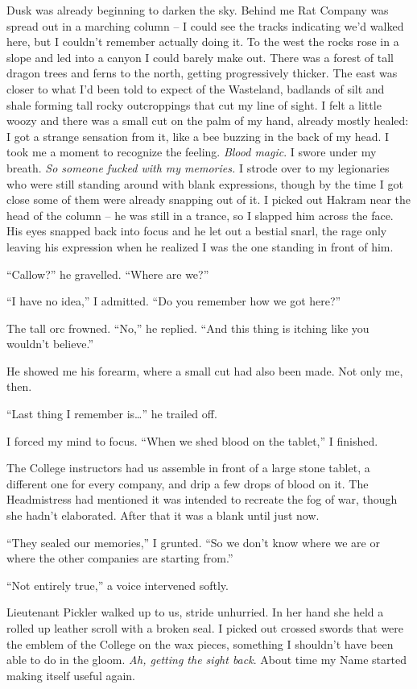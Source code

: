 \documentclass[12pt, openany]{book}
\begin{document}
Dusk was already beginning to darken the sky. Behind me Rat Company was spread out in a marching column – I could see the tracks indicating we’d walked here, but I couldn’t remember actually doing it. To the west the rocks rose in a slope and led into a canyon I could barely make out. There was a forest of tall dragon trees and ferns to the north, getting progressively thicker. The east was closer to what I’d been told to expect of the Wasteland, badlands of silt and shale forming tall rocky outcroppings that cut my line of sight. I felt a little woozy and there was a small cut on the palm of my hand, already mostly healed: I got a strange sensation from it, like a bee buzzing in the back of my head. I took me a moment to recognize the feeling. \textit{Blood magic}. I swore under my breath. \textit{So someone fucked with my memories.} I strode over to my legionaries who were still standing around with blank expressions, though by the time I got close some of them were already snapping out of it. I picked out Hakram near the head of the column – he was still in a trance, so I slapped him across the face. His eyes snapped back into focus and he let out a bestial snarl, the rage only leaving his expression when he realized I was the one standing in front of him.

“Callow?” he gravelled. “Where are we?”

“I have no idea,” I admitted. “Do you remember how we got here?”

The tall orc frowned. “No,” he replied. “And this thing is itching like you wouldn’t believe.”

He showed me his forearm, where a small cut had also been made. Not only me, then.

“Last thing I remember is…” he trailed off.

I forced my mind to focus. “When we shed blood on the tablet,” I finished.

The College instructors had us assemble in front of a large stone tablet, a different one for every company, and drip a few drops of blood on it. The Headmistress had mentioned it was intended to recreate the fog of war, though she hadn’t elaborated. After that it was a blank until just now.

“They sealed our memories,” I grunted. “So we don’t know where we are or where the other companies are starting from.”

“Not entirely true,” a voice intervened softly.

Lieutenant Pickler walked up to us, stride unhurried. In her hand she held a rolled up leather scroll with a broken seal. I picked out crossed swords that were the emblem of the College on the wax pieces, something I shouldn’t have been able to do in the gloom. \textit{Ah, getting the sight back}. About time my Name started making itself useful again.
\end{document}

